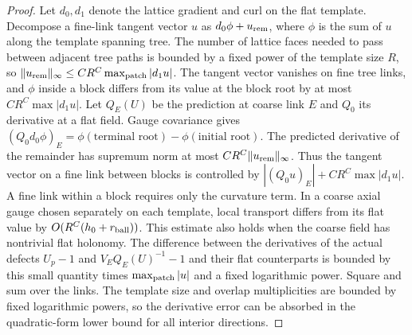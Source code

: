 \documentclass[11pt,a4paper]{article}
\numberwithin{equation}{section}
\begin{document}
\begin{proof}
Let \(d_0,d_1\) denote the lattice gradient and curl on the flat template. Decompose a fine-link tangent vector \(u\) as \(d_0\phi+u_{\rm rem}\), where \(\phi\) is the sum of \(u\) along the template spanning tree. The number of lattice faces needed to pass between adjacent tree paths is bounded by a fixed power of the template size \(R\), so
\(\|u_{\rm rem}\|_{\infty}\le CR^C\max_{\rm patch}|d_1u|\).
The tangent vector vanishes on fine tree links, and \(\phi\) inside a block differs from its value at the block root by at most \(CR^C\max|d_1u|\). Let \(Q_E(U)\) be the prediction at coarse link \(E\) and \(Q_0\) its derivative at a flat field. Gauge covariance gives
\((Q_0d_0\phi)_E=\phi(\text{terminal root})-\phi(\text{initial root})\).
The predicted derivative of the remainder has supremum norm at most \(CR^C\|u_{\rm rem}\|_\infty\). Thus the tangent vector on a fine link between blocks is controlled by \(|(Q_0u)_E|+CR^C\max|d_1u|\). A fine link within a block requires only the curvature term. In a coarse axial gauge chosen separately on each template, local transport differs from its flat value by \(O(R^C(h_0+r_{\rm ball}))\). This estimate also holds when the coarse field has nontrivial flat holonomy. The difference between the derivatives of the actual defects \(U_p-1\) and \(V_EQ_E(U)^{-1}-1\) and their flat counterparts is bounded by this small quantity times \(\max_{\rm patch}|u|\) and a fixed logarithmic power. Square and sum over the links. The template size and overlap multiplicities are bounded by fixed logarithmic powers, so the derivative error can be absorbed in the quadratic-form lower bound for all interior directions.


\end{proof}
\end{document}

